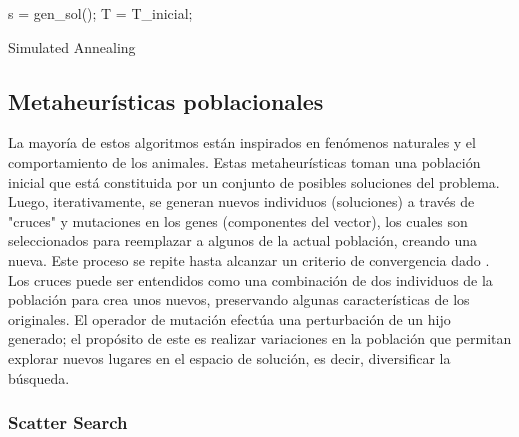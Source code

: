 \documentclass{ci5652}
\begin{document}
\begin{algorithm}
 \DontPrintSemicolon
 \vspace*{0.1cm}
  s = gen\_sol();\;
  T = T\_inicial;\;
 \vspace*{0.1cm}
 \caption{Simulated Annealing}
\end{algorithm}


\subsection{Metaheurísticas poblacionales}

La mayoría de estos algoritmos están inspirados en fenómenos naturales y el
comportamiento de los animales. Estas metaheurísticas toman una población
inicial que está constituida por un conjunto de posibles soluciones del
problema. Luego, iterativamente, se generan nuevos individuos (soluciones) a
través de "cruces" y mutaciones en los genes (componentes del vector), los
cuales son seleccionados para reemplazar a algunos de la actual población,
creando una nueva. Este proceso se repite hasta alcanzar un criterio de
convergencia dado \cite{Talbi_2009}.\\

Los cruces puede ser entendidos como una combinación de dos individuos de la
población para crea unos nuevos, preservando algunas características de los
originales. El operador de mutación efectúa una perturbación de un hijo
generado; el propósito de este es realizar variaciones en la población que
permitan explorar nuevos lugares en el espacio de solución, es decir,
diversificar la búsqueda.


\subsubsection{Scatter Search}
\end{document}
